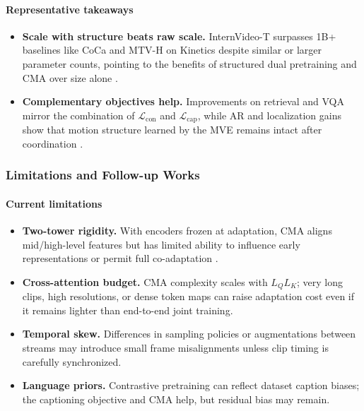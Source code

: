 \begin{enrichment}
\begin{enrichment}
        \paragraph{Representative takeaways}
        \begin{itemize}
            \item \textbf{Scale with structure beats raw scale.} InternVideo-T surpasses 1B+ baselines like CoCa and MTV-H on Kinetics despite similar or larger parameter counts, pointing to the benefits of structured dual pretraining and CMA over size alone \cite{wang2022_internvideo,yu2022_coca,yan2022_mtv}.
            \item \textbf{Complementary objectives help.} Improvements on retrieval and VQA mirror the combination of \(\mathcal{L}_{\text{con}}\) and \(\mathcal{L}_{\text{cap}}\), while AR and localization gains show that motion structure learned by the MVE remains intact after coordination \cite{wang2022_internvideo}.
        \end{itemize}
        
        \newpage
    
        \subsubsection{Limitations and Follow-up Works}
        \label{subsubsec_chapter24_internvideo_limits_future}
        
        \paragraph{Current limitations}
        \begin{itemize}
            \item \textbf{Two-tower rigidity.} With encoders frozen at adaptation, CMA aligns mid/high-level features but has limited ability to influence early representations or permit full co-adaptation \cite{wang2022_internvideo}. 
            \item \textbf{Cross-attention budget.} CMA complexity scales with \(L_Q L_K\); very long clips, high resolutions, or dense token maps can raise adaptation cost even if it remains lighter than end-to-end joint training. 
            \item \textbf{Temporal skew.} Differences in sampling policies or augmentations between streams may introduce small frame misalignments unless clip timing is carefully synchronized. 
            \item \textbf{Language priors.} Contrastive pretraining can reflect dataset caption biases; the captioning objective and CMA help, but residual bias may remain. 
        \end{itemize}
        

\end{enrichment}
\end{enrichment}
